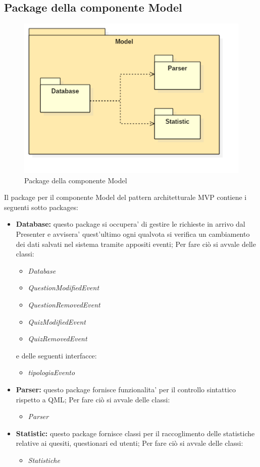 \documentclass[a4paper,11pt]{article}
\begin{document}
	\subsection{Package della componente Model}
	\begin{figure}[h!]
	\begin{center}
		\includegraphics[scale=0.65]{../images/ModelPackage.png}
		\caption{Package della componente Model}
	\end{center}
	\end{figure}
	Il package per il componente Model del pattern architetturale MVP contiene i seguenti sotto packages:
	\begin{itemize}
		\item\textbf{Database:} questo package si occupera' di gestire le richieste in arrivo dal Presenter e avvisera' quest'ultimo ogni qualvota si verifica un cambiamento dei dati salvati nel sistema tramite appositi eventi; Per fare ciò si avvale delle classi:
			\begin{itemize}
				\item\textit{Database}
				\item\textit{QuestionModifiedEvent}
				\item\textit{QuestionRemovedEvent}
				\item\textit{QuizModifiedEvent}
				\item\textit{QuizRemovedEvent}
			\end{itemize}
				e delle seguenti interfacce:
			\begin{itemize}
				\item\textit{tipologiaEvento}
			\end{itemize}
		\item\textbf{Parser:} questo package fornisce funzionalita' per il controllo sintattico rispetto a QML; Per fare ciò si avvale delle classi:
			\begin{itemize}
				\item\textit{Parser}
			\end{itemize}
		\item\textbf{Statistic:} questo package fornisce classi per il raccoglimento delle statistiche relative ai quesiti, questionari ed utenti; Per fare ciò si avvale delle classi:
			\begin{itemize}
				\item\textit{Statistiche}
			\end{itemize}
		\end{itemize}
		\newpage
	
\end{document}
